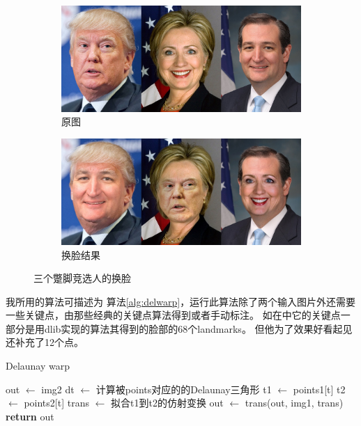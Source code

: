 \documentclass[twocolumn,11pt]{ctexart}
\begin{document}
\begin{figure}[htb]
    \centering
    \begin{subfigure}[b]{0.7\linewidth}
        \includegraphics[width=\linewidth]{presidential-original.jpg}
        \caption{原图}
      \end{subfigure}
      \begin{subfigure}[b]{0.7\linewidth}
        \includegraphics[width=\linewidth]{presidential-swap.jpg}
        \caption{换脸结果}
      \end{subfigure}
      \caption{三个蹩脚竞选人的换脸}
      \label{fig:presid}
\end{figure}

我所用的算法可描述为 算法\ref{alg:delwarp}，运行此算法除了两个输入图片外还需要一些关键点，由那些经典的关键点算法得到或者手动标注。
如在\cite{swapface}中它的关键点一部分是用dlib实现的算法\cite{viola2001rapid}其得到的脸部的68个landmarks。
但他为了效果好看起见还补充了12个点。

\begin{algorithm}[htb]
    \caption{Delaunay warp}
    \begin{algorithmic}[1]
        \State out $\gets$ img2
        \State dt $\gets$ 计算被points对应的的Delaunay三角形
            \State t1 $\gets$ points1[t]
            \State t2 $\gets$ points2[t]
            \State trans $\gets$ 拟合t1到t2的仿射变换
            \State out $\gets$ trans(out, img1, trans) 
        \EndFor
        \State \textbf{return} out
    \EndProcedure
    \end{algorithmic}
    \label{alg:delwarp}
\end{algorithm}
\end{document}
